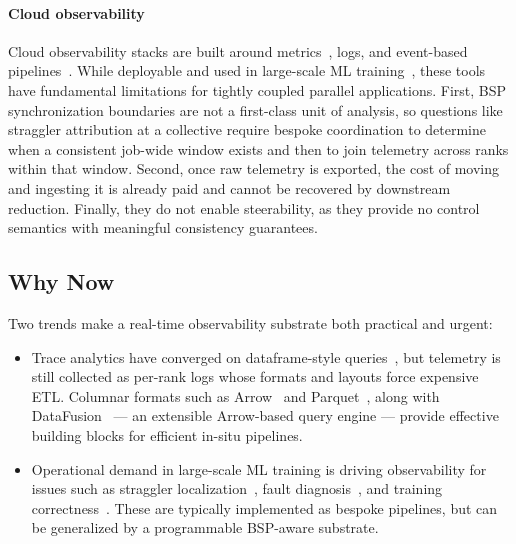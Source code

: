 \paragraph{Cloud observability}
Cloud observability stacks are built around metrics~\cite{:Prometheus}, logs, and event-based
pipelines~\cite{Kreps2011:Kafka,Carbo2015:ApacheFlink}.
While deployable and used in large-scale ML training~\cite{Deng2025:Mycroft}, these tools have
fundamental limitations for
tightly coupled parallel applications.
First, BSP synchronization boundaries are not a first-class unit of analysis, so questions like
straggler attribution at a collective require bespoke coordination to determine when a consistent
job-wide window exists and then to join telemetry across ranks within that window.
Second, once raw telemetry is exported, the cost of moving and ingesting it is already paid and
cannot be recovered by downstream reduction.
Finally, they do not enable steerability, as they provide no control semantics with meaningful
consistency guarantees.

\subsection{Why Now}

Two trends make a real-time observability substrate both practical and urgent:

\begin{itemize}[leftmargin=*]
  \item Trace analytics have converged on dataframe-style
        queries~\cite{Devar2024:DFTracer,Bhate2019:Hatchet,Boehm2016:Caliper,Yildi2023:IOMax}, but
        telemetry is still
        collected as per-rank logs whose formats and layouts force expensive ETL.
        Columnar formats such as Arrow~\cite{:ApacheArrow} and Parquet~\cite{:ApacheParquet}, along with
        DataFusion~\cite{Lamb2024:DataFusion} --- an extensible Arrow-based
        query engine --- provide effective building blocks for efficient in-situ pipelines.

  \item Operational demand in large-scale ML training is driving observability for issues such as
        straggler
        localization~\cite{Yao2025:Holmes,Wu2025:GREYHOUND,Cui2025:XPUTimer,Guan2025:PerfTracker,Chen2025:Reveal},
        fault diagnosis~\cite{Deng2025:Minder,Dong2025:Aegis},
        and training correctness~\cite{Jiang2025:TrainCheck}.
        These are typically implemented as bespoke pipelines, but can be generalized by a
        programmable BSP-aware substrate.
\end{itemize}




